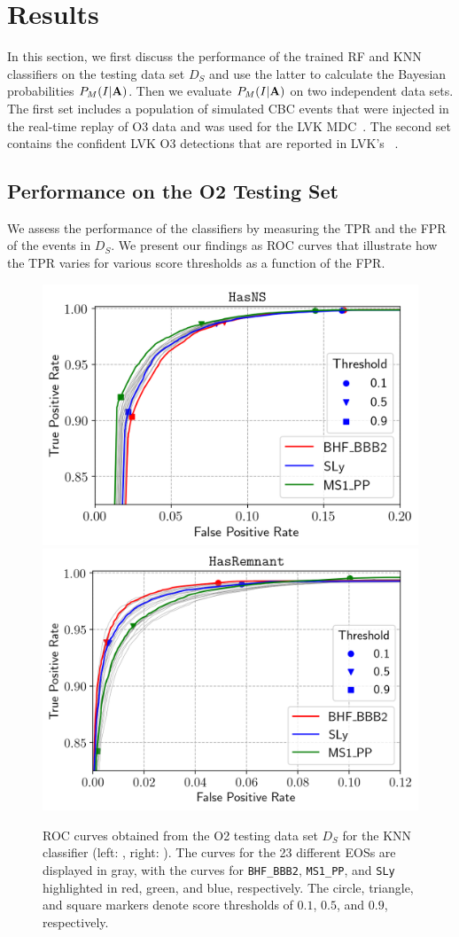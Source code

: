 \section{Results} \label{results}

In this section, we first discuss the performance of the trained \ac{RF} and \ac{KNN} classifiers on the testing data set $D_S$ and use the latter to calculate the Bayesian probabilities
$P_M(I|{\bf A})$. Then we evaluate $P_M(I|{\bf A})$ on two independent data sets. The first set includes a population of simulated \ac{CBC} events that were injected in the real-time
replay of \ac{O3} data and was used for the \ac{LVK} \ac{MDC}~\cite{Chaudhary:2023vec}. The second set contains the confident \ac{LVK} \ac{O3} detections that are reported in \ac{LVK}'s
~.

\subsection{Performance on the O2 Testing Set}

We assess the performance of the classifiers by measuring the \ac{TPR} and the \ac{FPR} of the events in $D_S$. We present our findings as \ac{ROC} curves that illustrate how the \ac{TPR}
varies for various score thresholds as a function of the \ac{FPR}.

\begin{figure}%
\includegraphics[width=0.45\linewidth]{roc_testing_KNN_NS}
\includegraphics[width=0.45\linewidth]{roc_testing_KNN_REM}
\caption{\ac{ROC} curves obtained from the \ac{O2} testing data set $D_S$ for the \ac{KNN} classifier (left: \hasns, right: \hasrem). The curves for the 23 different \ac{EOS}s are displayed in
gray, with the curves for {\tt BHF\_BBB2}, {\tt MS1\_PP}, and {\tt SLy} highlighted in red, green, and blue, respectively. The circle, triangle, and square markers denote score thresholds of
$0.1$, $0.5$, and $0.9$, respectively.}
\label{fig:rocO2_KNN}
\end{figure}

